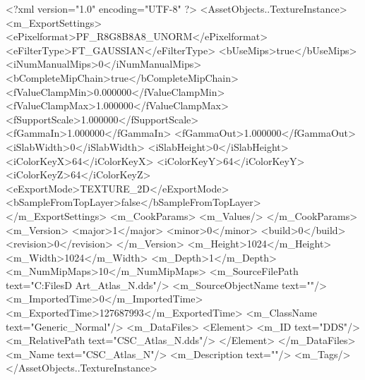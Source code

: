 <?xml version="1.0" encoding="UTF-8" ?>
<AssetObjects..TextureInstance>
	<m_ExportSettings>
		<ePixelformat>PF_R8G8B8A8_UNORM</ePixelformat>
		<eFilterType>FT_GAUSSIAN</eFilterType>
		<bUseMips>true</bUseMips>
		<iNumManualMips>0</iNumManualMips>
		<bCompleteMipChain>true</bCompleteMipChain>
		<fValueClampMin>0.000000</fValueClampMin>
		<fValueClampMax>1.000000</fValueClampMax>
		<fSupportScale>1.000000</fSupportScale>
		<fGammaIn>1.000000</fGammaIn>
		<fGammaOut>1.000000</fGammaOut>
		<iSlabWidth>0</iSlabWidth>
		<iSlabHeight>0</iSlabHeight>
		<iColorKeyX>64</iColorKeyX>
		<iColorKeyY>64</iColorKeyY>
		<iColorKeyZ>64</iColorKeyZ>
		<eExportMode>TEXTURE_2D</eExportMode>
		<bSampleFromTopLayer>false</bSampleFromTopLayer>
	</m_ExportSettings>
	<m_CookParams>
		<m_Values/>
	</m_CookParams>
	<m_Version>
		<major>1</major>
		<minor>0</minor>
		<build>0</build>
		<revision>0</revision>
	</m_Version>
	<m_Height>1024</m_Height>
	<m_Width>1024</m_Width>
	<m_Depth>1</m_Depth>
	<m_NumMipMaps>10</m_NumMipMaps>
	<m_SourceFilePath text="C:\Users\Shadow\Desktop\Working Files\3D Art\Textures\CSC_Atlas_N.dds"/>
	<m_SourceObjectName text=""/>
	<m_ImportedTime>0</m_ImportedTime>
	<m_ExportedTime>127687993</m_ExportedTime>
	<m_ClassName text="Generic_Normal"/>
	<m_DataFiles>
		<Element>
			<m_ID text="DDS"/>
			<m_RelativePath text="CSC_Atlas_N.dds"/>
		</Element>
	</m_DataFiles>
	<m_Name text="CSC_Atlas_N"/>
	<m_Description text=""/>
	<m_Tags/>
</AssetObjects..TextureInstance>

